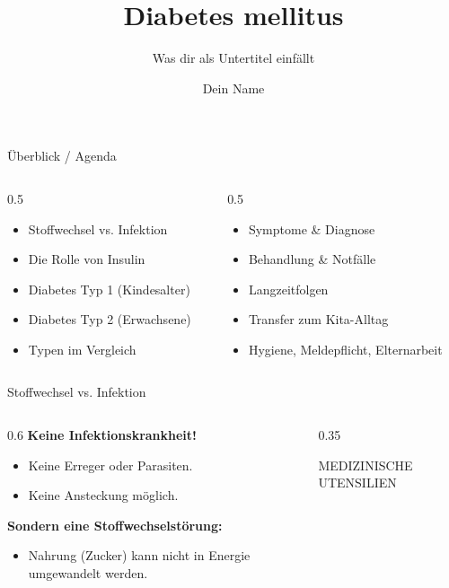 \documentclass[10pt, aspectratio=169]{beamer}
\title{Diabetes mellitus}
\subtitle{Was dir als Untertitel einfällt}
\author{Dein Name}
\institute{Institut}
\newcommand{\imagebox}[2]{%
	\begin{tcolorbox}[enhanced, colback=white, colframe=KitaBlue!20, arc=3mm, width=\textwidth, height=#1, valign=center, halign=center]
		\centering
		\vspace{0.5em}
		\scriptsize \color{KitaBlue!60} \MakeUppercase{#2}
	\end{tcolorbox}
}
\begin{document}
	
	{
		\begin{frame}
			\titlepage
		\end{frame}
	}
	
	\begin{frame}{Überblick / Agenda}
		\begin{columns}[t]
			\begin{column}{0.5\textwidth}
				\begin{itemize}
					\item Stoffwechsel vs. Infektion
					\item Die Rolle von Insulin
					\item Diabetes Typ 1 (Kindesalter)
					\item Diabetes Typ 2 (Erwachsene)
					\item Typen im Vergleich
				\end{itemize}
			\end{column}
			\begin{column}{0.5\textwidth}
				\begin{itemize}
					\item Symptome \& Diagnose
					\item Behandlung \& Notfälle
					\item Langzeitfolgen
					\item Transfer zum Kita-Alltag
					\item Hygiene, Meldepflicht, Elternarbeit
				\end{itemize}
			\end{column}
		\end{columns}
	\end{frame}
	
	\begin{frame}{Stoffwechsel vs. Infektion}
		\begin{columns}
			\begin{column}{0.6\textwidth}
				\textbf{Keine Infektionskrankheit!}
				\begin{itemize}
					\item Keine Erreger oder Parasiten.
					\item Keine Ansteckung möglich.
				\end{itemize}
				\vspace{1em}
				\textbf{Sondern eine Stoffwechselstörung:}
				\begin{itemize}
					\item Nahrung (Zucker) kann nicht in Energie umgewandelt werden.
				\end{itemize}
			\end{column}
			\begin{column}{0.35\textwidth}
				\imagebox{4.5cm}{Medizinische Utensilien}
			\end{column}
		\end{columns}
	\end{frame}
	
\end{document}

